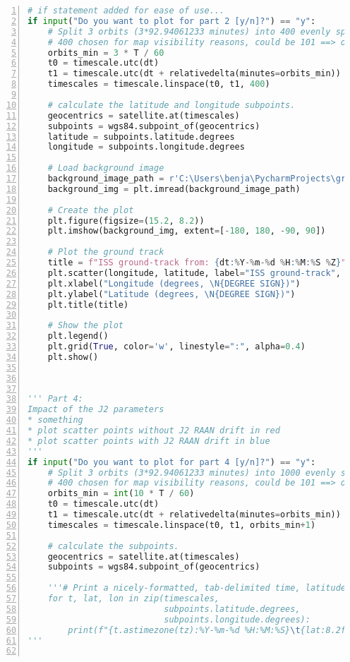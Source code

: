 \begin{appendices}
\begin{lstlisting}[frame=single, language=Python, numbers=left]
# if statement added for ease of use...
if input("Do you want to plot for part 2 [y/n]?") == "y":
    # Split 3 orbits (3*92.94061233 minutes) into 400 evenly spaced Timescales as indicated by points
    # 400 chosen for map visibility reasons, could be 101 ==> one plot every 2 min + endpoints
    orbits_min = 3 * T / 60
    t0 = timescale.utc(dt)
    t1 = timescale.utc(dt + relativedelta(minutes=orbits_min))
    timescales = timescale.linspace(t0, t1, 400)

    # calculate the latitude and longitude subpoints.
    geocentrics = satellite.at(timescales)
    subpoints = wgs84.subpoint_of(geocentrics)
    latitude = subpoints.latitude.degrees
    longitude = subpoints.longitude.degrees

    # Load background image
    background_image_path = r'C:\Users\benja\PycharmProjects\groundtrack\earth.jpg'
    background_img = plt.imread(background_image_path)

    # Create the plot
    plt.figure(figsize=(15.2, 8.2))
    plt.imshow(background_img, extent=[-180, 180, -90, 90])

    # Plot the ground track
    title = f"ISS ground-track from: {dt:%Y-%m-%d %H:%M:%S %Z}"
    plt.scatter(longitude, latitude, label="ISS ground-track", color='red', marker='o', s=1)
    plt.xlabel("Longitude (degrees, \N{DEGREE SIGN})")
    plt.ylabel("Latitude (degrees, \N{DEGREE SIGN})")
    plt.title(title)

    # Show the plot
    plt.legend()
    plt.grid(True, color='w', linestyle=":", alpha=0.4)
    plt.show()



''' Part 4: 
Impact of the J2 parameters
* something
* plot scatter points without J2 RAAN drift in red
* plot scatter points with J2 RAAN drift in blue
'''
if input("Do you want to plot for part 4 [y/n]?") == "y":
    # Split 3 orbits (3*92.94061233 minutes) into 1000 evenly spaced Timescales as indicated by points
    # 400 chosen for map visibility reasons, could be 101 ==> one plot every 2 min + endpoints
    orbits_min = int(10 * T / 60)
    t0 = timescale.utc(dt)
    t1 = timescale.utc(dt + relativedelta(minutes=orbits_min))
    timescales = timescale.linspace(t0, t1, orbits_min+1)

    # calculate the subpoints.
    geocentrics = satellite.at(timescales)
    subpoints = wgs84.subpoint_of(geocentrics)

    '''# Print a nicely-formatted, tab-delimited time, latitude, and longitude.
    for t, lat, lon in zip(timescales,
                           subpoints.latitude.degrees,
                           subpoints.longitude.degrees):
        print(f"{t.astimezone(tz):%Y-%m-%d %H:%M:%S}\t{lat:8.2f}\t{lon:8.2f}")
'''


\end{lstlisting}
\end{appendices}
